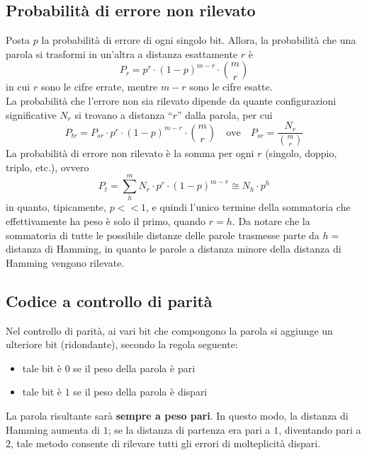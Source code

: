 \documentclass[a4paper]{extarticle}
\newcommand{\quotes}[1]{``#1''}
\begin{document}
\vspace{1em}
\noindent
\subsection{Probabilità di errore non rilevato}
Posta $p$ la probabilità di errore di ogni singolo bit. Allora, la probabilità che una parola si trasformi in un'altra a distanza esattamente $r$ è
\[P_r = p^r \cdot (1-p)^{m-r} \cdot \binom{m}{r}\]
in cui $r$ sono le cifre errate, mentre $m-r$ sono le cifre esatte.\\
La probabilità che l'errore non sia rilevato dipende da quante configurazioni significative $N_r$ si trovano a distanza \quotes{$r$} dalla parola, per cui
\[P_{tr} = P_{sr} \cdot p^r \cdot (1-p)^{m-r} \cdot \binom{m}{r} \hspace{1em} \text{ove} \hspace{1em} P_{sr} = \dfrac{N_r}{\displaystyle{\binom{m}{r}}}\]
La probabilità di errore non rilevato è la somma per ogni $r$ (singolo, doppio, triplo, etc.), ovvero
\[P_t = \sum_h^m N_r \cdot p^r \cdot (1-p)^{m-r} \cong N_h \cdot p^h\]
in quanto, tipicamente, $p<<1$, e quindi l'unico termine della sommatoria che effettivamente ha peso è solo il primo, quando $r=h$. Da notare che la sommatoria di tutte le possibile distanze delle parole trasmesse parte da $h=$ distanza di Hamming, in quanto le parole a distanza minore della distanza di Hamming vengono rilevate.

\vspace{1em}
\noindent
\subsection{Codice a controllo di parità}
Nel controllo di parità, ai vari bit che compongono la parola si aggiunge un ulteriore bit (ridondante), secondo la regola seguente:
\begin{itemize}
    \item tale bit è $0$ se il peso della parola è pari
    \item tale bit è $1$ se il peso della parola è dispari
\end{itemize}
La parola risultante sarà \textbf{sempre a peso pari}. In questo modo, la distanza di Hamming aumenta di $1$; se la distanza di partenza era pari a $1$, diventando pari a $2$, tale metodo consente di rilevare tutti gli errori di molteplicità dispari.
\end{document}
